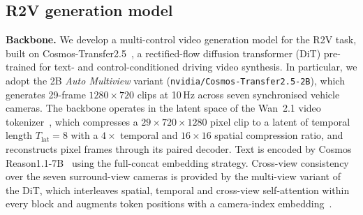 \subsection*{R2V generation model}\label{sec:baseline}

\textbf{Backbone.}
We develop a multi-control video generation model for the R2V
task, built on
Cosmos-Transfer2.5~\cite{cosmos2025transfer,agarwal2025cosmos},
a rectified-flow diffusion transformer (DiT) pre-trained for
text- and control-conditioned driving video synthesis. In
particular, we adopt the 2B \emph{Auto Multiview} variant
(\texttt{nvidia/Cosmos-Transfer2.5-2B}), which generates
29-frame $1280\!\times\!720$ clips at 10\,Hz across seven
synchronised vehicle cameras. The backbone operates in the
latent space of the Wan~2.1 video
tokenizer~\cite{wan2pt1}, which compresses a
$29\!\times\!720\!\times\!1280$ pixel clip to a latent of
temporal length $T_{\mathrm{lat}}\!=\!8$ with a $4\!\times$
temporal and $16\!\times\!16$ spatial compression ratio, and
reconstructs pixel frames through its paired decoder. Text is
encoded by Cosmos Reason1.1-7B~\cite{cosmos_reason} using the
full-concat embedding strategy. Cross-view consistency over
the seven surround-view cameras is provided by the multi-view
variant of the DiT, which interleaves spatial, temporal and
cross-view self-attention within every block and augments
token positions with a camera-index
embedding~\cite{cosmos2025transfer}.

